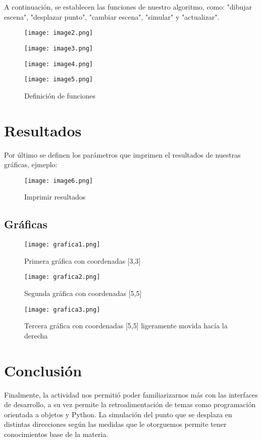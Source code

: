 \documentclass[a4paper, 10pt]{article}
\begin{document}
%
\raggedright 
A continuación, se establecen las funciones de nuestro algoritmo, como: "dibujar escena", "desplazar punto", "cambiar escena", "simular" y "actualizar".

\begin{figure}[H] %
\centering
\texttt{[image: image2.png]}

\vspace{0.5cm}

\texttt{[image: image3.png]}

\vspace{0.5cm}

\texttt{[image: image4.png]}

\vspace{0.5cm}

\texttt{[image: image5.png]}
\caption{Definición de funciones}
\label{fig:1}
\end{figure}

\section{Resultados}\label{s:5}
Por último se definen los parámetros que imprimen el resultados de nuestras gráficas, ejmeplo:

\begin{figure}[H] %
\centering
\texttt{[image: image6.png]}
\caption{Imprimir resultados }
\label{fig:1}
\end{figure}

\subsection{Gráficas}
\vspace{0.5cm}

\begin{figure}[H] %
\centering
\texttt{[image: grafica1.png]}
\caption{Primera gráfica con coordenadas [3,3]}
\label{fig:1}
\end{figure}

\begin{figure}[H] %
\centering
\texttt{[image: grafica2.png]}
\caption{Segunda gráfica con coordenadas [5,5]}
\label{fig:1}
\end{figure}

\begin{figure}[H] %
\centering
\texttt{[image: grafica3.png]}
\caption{Tercera gráfica con coordenadas [5,5] ligeramente movida hacía la derecha}
\label{fig:1}
\end{figure}

\section{Conclusión}\label{s:5}
Finalmente, la actividad nos permitió poder familiarizarnos más con las interfaces de desarrollo, a su vez permite la retroalimentación de temas como programación orientada a objetos y Python. La simulación del punto que se desplaza en distintas direcciones según las medidas que le otorguemos permite tener conocimientos base de la materia. 
\end{document}
